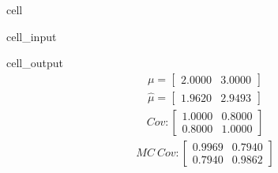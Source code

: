 \documentclass[letterpaper,10pt,english]{jupyterBook}
\begin{document}
\begin{sphinxuseclass}{cell}
\begin{sphinxVerbatimInput}
\begin{sphinxuseclass}{cell_input}
\begin{sphinxVerbatim}[commandchars=\\\{\}]
 
 
 
 
\end{sphinxVerbatim}

\end{sphinxuseclass}\end{sphinxVerbatimInput}
\begin{sphinxVerbatimOutput}

\begin{sphinxuseclass}{cell_output}
\noindent{}
\begin{equation*}
\begin{split}\displaystyle \mu=\left[
\begin{array}{}
  2.0000 &  3.0000
\end{array}
\right]\end{split}
\end{equation*}\begin{equation*}
\begin{split}\displaystyle \hat{\mu}=\left[
\begin{array}{}
  1.9620 &  2.9493
\end{array}
\right]\end{split}
\end{equation*}\begin{equation*}
\begin{split}\displaystyle Cov:\left[
\begin{array}{}
  1.0000 &  0.8000\\
  0.8000 &  1.0000
\end{array}
\right]\end{split}
\end{equation*}\begin{equation*}
\begin{split}\displaystyle MC\ Cov:\left[
\begin{array}{}
  0.9969 &  0.7940\\
  0.7940 &  0.9862
\end{array}
\right]\end{split}
\end{equation*}
\end{sphinxuseclass}\end{sphinxVerbatimOutput}

\end{sphinxuseclass}
\end{document}
